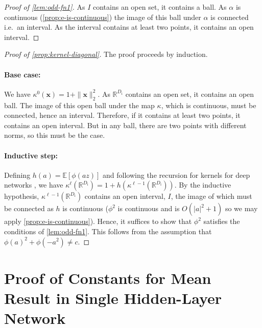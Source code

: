 \documentclass[twoside]{article}
\renewcommand{\ss}[1]{_{\text{#1}}}
\newcommand{\vx}{\mathbf{x}}
\newcommand{\E}{\mathbb{E}}
\newcommand{\R}{\mathbb{R}}
\renewcommand{\ss}[1]{_{\text{#1}}}        %
\theoremstyle{theoremstyle}
\begin{document}
\begin{proof}[Proof of \cref{lem:odd-fn1}]
As $I$ contains an open set, it contains a ball. As $\alpha$ is continuous (\cref{prop:e-is-continuous}) the image of this ball under $\alpha$ is connected i.e.~an interval. As the interval contains at least two points, it contains an open interval. 
\end{proof}

\begin{proof}[Proof of \cref{prop:kernel-diagonal}]
The proof proceeds by induction. 

\paragraph{Base case:}
We have $\kappa^{0}(\vx) = 1+ \|\vx\|^2_2$. As $\R^{D\ss{i}}$ contains an open set, it contains an open ball. The image of this open ball under the map $\kappa$, which is continuous, must be connected, hence an interval. Therefore, if it contains at least two points, it contains an open interval. But in any ball, there are two points with different norms, so this must be the case. 

\paragraph{Inductive step:}
Defining $h(a) = \E[\phi(az)]$ and following the recursion for kernels for deep networks \citet[Lemma 2]{matthews_2018}, we have $\kappa^{\ell}(\R^{D\ss{i}}) = 1+ h(\kappa^{\ell-1}(\R^{D\ss{i}}))$. By the inductive hypothesis, $\kappa^{\ell-1}(\R^{D\ss{i}})$ contains an open interval, $I$, the image of which must be connected as $h$ is continuous ($\phi^2$ is continuous and is $O(|a|^2+1)$ so we may apply \cref{prop:e-is-continuous}). Hence, it suffices to show that $\phi^2$ satisfies the conditions of \cref{lem:odd-fn1}. This follows from the assumption that $\phi(a)^2+\phi(-a^2) \neq c$.
\end{proof}
\section{Proof of Constants for Mean Result in Single Hidden-Layer Network}\label{app:1hl-good-constants}
\end{document}
